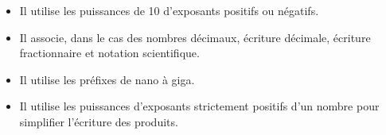 \begin{prerequis}[Prérequis de 4\up{e}]  
    \begin{itemize}  
        \item Il utilise les puissances de 10 d’exposants positifs ou négatifs.
        \item Il associe, dans le cas des nombres décimaux, écriture décimale, écriture fractionnaire et
        notation scientifique.
        \item Il utilise les préfixes de nano à giga.        
        \item Il utilise les puissances d’exposants strictement positifs d’un nombre pour simplifier l’écriture
        des produits.
    \end{itemize}
\end{prerequis}
